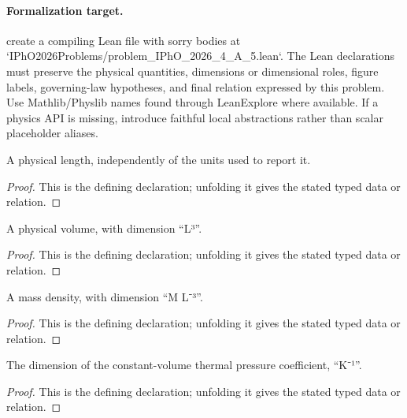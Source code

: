 \paragraph{Formalization target.}
create a compiling Lean file with sorry bodies at `IPhO2026Problems/problem\_IPhO\_2026\_4\_A\_5.lean`. The Lean declarations must preserve the physical quantities, dimensions or dimensional roles, figure labels, governing-law hypotheses, and final relation expressed by this problem.
Use Mathlib/Physlib names found through LeanExplore where available. If a physics API is missing, introduce faithful local abstractions rather than scalar placeholder aliases.

\begin{definition}[Length]
  \label{decl:physics:IPhO_2026_4_A_5:Length}
  A physical length, independently of the units used to report it.
\end{definition}
\begin{proof}
  This is the defining declaration; unfolding it gives the stated typed data or relation.
\end{proof}

\begin{definition}[Volume]
  \label{decl:physics:IPhO_2026_4_A_5:Volume}
  A physical volume, with dimension “L³”.
\end{definition}
\begin{proof}
  This is the defining declaration; unfolding it gives the stated typed data or relation.
\end{proof}

\begin{definition}[MassDensity]
  \label{decl:physics:IPhO_2026_4_A_5:MassDensity}
  A mass density, with dimension “M L⁻³”.
\end{definition}
\begin{proof}
  This is the defining declaration; unfolding it gives the stated typed data or relation.
\end{proof}

\begin{definition}[ThermalPressureCoefficient]
  \label{decl:physics:IPhO_2026_4_A_5:ThermalPressureCoefficient}
  The dimension of the constant-volume thermal pressure coefficient, “K⁻¹”.
\end{definition}
\begin{proof}
  This is the defining declaration; unfolding it gives the stated typed data or relation.
\end{proof}

